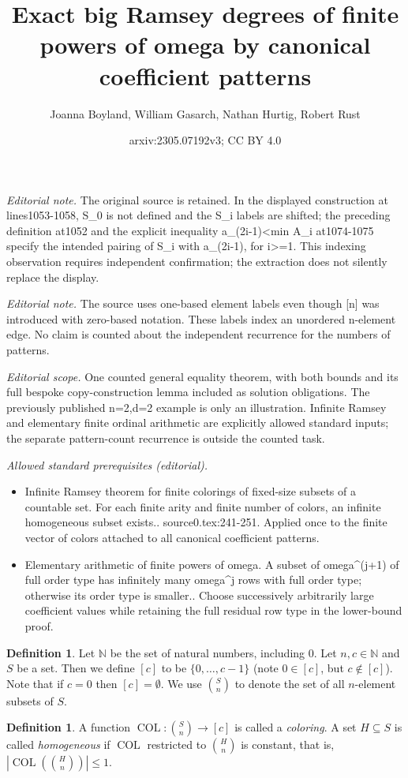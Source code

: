 \documentclass[10pt,a4paper]{article}
\title{Exact big Ramsey degrees of finite powers of omega by canonical coefficient patterns}
\author{Joanna Boyland, William Gasarch, Nathan Hurtig, Robert Rust}
\date{arxiv:2305.07192v3; CC BY 4.0}
\newcommand{\COL}{\operatorname{COL}}
\newcommand{\N}{\mathbb{N}}
\newcommand{\numpoints}{n}
\newcommand{\numcolors}{c}
\theoremstyle{plain}
\theoremstyle{definition}
\newtheorem{definition}[theorem]{Definition}
\begin{document}
\maketitle
\noindent\textit{Editorial note.} The original source is retained. In the displayed construction at lines1053-1058, S\_0 is not defined and the S\_i labels are shifted; the preceding definition at1052 and the explicit inequality a\_(2i-1)<min A\_i at1074-1075 specify the intended pairing of S\_i with a\_(2i-1), for i>=1. This indexing observation requires independent confirmation; the extraction does not silently replace the display.\par\medskip
\noindent\textit{Editorial note.} The source uses one-based element labels even though [n] was introduced with zero-based notation. These labels index an unordered n-element edge. No claim is counted about the independent recurrence for the numbers of patterns.\par\medskip
\noindent\textit{Editorial scope.} One counted general equality theorem, with both bounds and its full bespoke copy-construction lemma included as solution obligations. The previously published n=2,d=2 example is only an illustration. Infinite Ramsey and elementary finite ordinal arithmetic are explicitly allowed standard inputs; the separate pattern-count recurrence is outside the counted task.\par\medskip
\noindent\textit{Allowed standard prerequisites (editorial).}\begin{itemize}
\item Infinite Ramsey theorem for finite colorings of fixed-size subsets of a countable set. For each finite arity and finite number of colors, an infinite homogeneous subset exists.. source0.tex:241-251. Applied once to the finite vector of colors attached to all canonical coefficient patterns.
\item Elementary arithmetic of finite powers of omega. A subset of omega\textasciicircum{}(j+1) of full order type has infinitely many omega\textasciicircum{}j rows with full order type; otherwise its order type is smaller.. Choose successively arbitrarily large coefficient values while retaining the full residual row type in the lower-bound proof.
\end{itemize}\medskip
\begin{definition}
Let $\N$ be the set of natural numbers, including 0. 
Let $\numpoints,\numcolors \in \N$ and $S$ be a set. Then we define $[\numcolors]$ to be $ \{ 0, \ldots, \numcolors-1\}$
(note $0 \in [\numcolors]$, but $\numcolors \not \in [\numcolors]$). Note that if $\numcolors=0$ then $[\numcolors] = \emptyset$. 
We use $\binom{S}{\numpoints}$ to denote the set of all $\numpoints$-element subsets of $S$. 
\end{definition}
\begin{definition}
    A function $\COL\colon \binom{S}{\numpoints} \to [\numcolors]$ is called a \textit{coloring}.
    A set $H\subseteq S$ is called \textit{homogeneous} if $\COL$ restricted to 
    $\binom{H}{\numpoints}$ is constant,
    that is, $\left|\COL\left(\binom{H}{\numpoints}\right)\right|\le 1$.
\end{definition}
\end{document}
